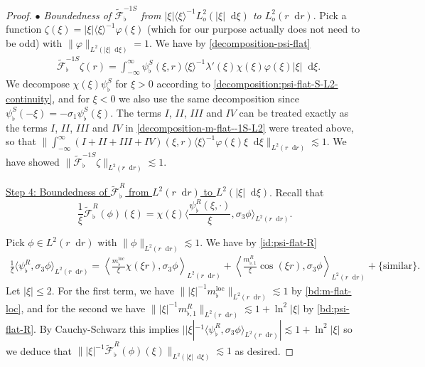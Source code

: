 \documentclass[11 pt]{amsart}
\newcommand{\tmop}[1]{\ensuremath{\operatorname{#1}}}
\theoremstyle{definition}
\theoremstyle{remark}
\numberwithin{equation}{section}
\newcommand{\dd}{\mathop{}\!\mathrm{d}}
\begin{document}
\begin{proof}
\smallskip

\noindent \textit{$\bullet$ Boundedness of $\widetilde{\mathcal F}^{-1S}_\flat$ from $|\xi| \langle \xi\rangle^{-1}L^2_{o}(|\xi|\dd \xi)$ to $L^2_{o}(r\dd r)$}. Pick a function $\zeta(\xi) = |\xi|\langle \xi \rangle^{-1} \varphi(\xi) $ (which for our purpose actually does not need to be odd) with $\| \varphi\|_{L^2(|\xi|\dd \xi)}= 1$. We have by \eqref{decomposition-psi-flat}
\begin{align*}
&\widetilde {\mathcal F}_\flat ^{-1S} \zeta (r) = \int_{-\infty}^\infty \psi_\flat^S(\xi,r) \langle \xi \rangle^{-1}\lambda'(\xi)\chi(\xi)\varphi(\xi)|\xi| \dd \xi .
\end{align*}
We decompose $\chi(\xi)\psi_\flat^S$ for $\xi>0$ according to \eqref{decomposition:psi-flat-S-L2-continuity}, and for $\xi<0$ we also use the same decomposition since $\psi^S_\flat(-\xi)=-\sigma_1\psi^S_\flat(\xi)$. The terms $I$, $II$, $III$ and $IV$ can be treated exactly as the terms $I$, $II$, $III$ and $IV$ in \eqref{decomposition-m-flat--1S-L2} were treated above, so that $\| \int_{-\infty}^\infty (I+II+III+IV)(\xi,r)\langle \xi \rangle^{-1} \varphi(\xi)\xi \dd \xi   \|_{L^2(r\dd r)} \lesssim 1$. We have showed $ \| \widetilde{\mathcal F}_\flat^{-1S} \zeta \|_{L^2(r \dd r)} \lesssim 1$.

\medskip

\noindent \underline{Step 4: Boundedness of $\widetilde{\mathcal F}^R_\flat$ from $L^{2}(r\dd r)$ to $L^2(|\xi|\dd \xi)$}. Recall that $$\frac{1}{\xi} \widetilde{\mathcal{F}}_\flat^R (\phi)(\xi) =  \chi(\xi)\langle \frac{\psi_\flat^R (\xi,\cdot)}{\xi}, \sigma_3 \phi \rangle_{L^2(r\dd r)}.$$

Pick $\phi \in L^2(r\dd r)$ with $\| \phi \|_{L^2(r\dd r)}\lesssim 1$. We have by \eqref{id:psi-flat-R}
\begin{align} \label{id:psiRflat-phi-expression}
\frac{1}{\xi}\langle \psi_\flat^R ,\sigma_3\phi\rangle_{L^2(r\dd r)}= \left\langle \frac{m_{\flat}^{\tmop{loc}} }{\xi}  \chi (\xi r), \sigma_3 \phi \right\rangle_{L^2(r\dd r)}+\left\langle \frac{m_{\flat, 1}^R}{\xi} \cos (\xi r),\sigma_3 \phi\right\rangle_{L^2(r\dd r)}+ \{\mbox{similar} \}.
\end{align}
Let $|\xi|\leq 2$. For the first term, we have $\| |\xi|^{-1}m_{\flat}^{\tmop{loc}} \|_{L^2(r\dd r)}\lesssim 1$ by \eqref{bd:m-flat-loc}, and for the second we have $\| |\xi|^{-1}m_{\flat,1}^{R} \|_{L^2(r\dd r)}\lesssim 1+ \ln^2 |\xi|$ by \eqref{bd:psi-flat-R}. By Cauchy-Schwarz this implies $||\xi|^{-1}\langle \psi_\flat^R ,\sigma_3\phi\rangle_{L^2(r\dd r)}|\lesssim 1+\ln^2 |\xi|$ so we deduce that $\| |\xi|^{-1} \widetilde{\mathcal{F}}_\flat^R (\phi)(\xi)\|_{L^2(|\xi|\dd\xi)}\lesssim 1$ as desired.


\end{proof}
\end{document}
